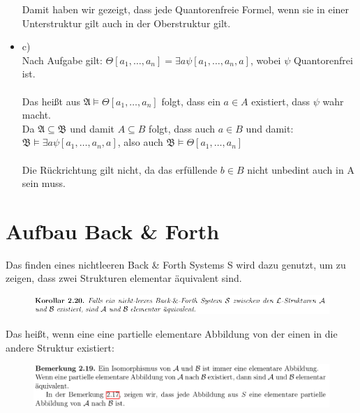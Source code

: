 \documentclass[a4paper]{scrartcl}
\begin{document}
\begin{itemize}
\begin{itemize}
            \end{itemize}

            Damit haben wir gezeigt, dass jede Quantorenfreie Formel, wenn sie in einer Unterstruktur gilt auch in der Oberstruktur gilt.\\

        \item c)\\
            Nach Aufgabe gilt: $\Theta[a_1,\dots,a_n] = \exists a \psi[a_1,\dots,a_n,a]$, wobei $\psi$ Quantorenfrei ist.\\
            \\Das heißt aus $\mathfrak{A} \vDash \Theta[a_1,\dots,a_n]$ folgt, dass ein $a \in A$ existiert, dass $\psi$ wahr macht.\\
            Da $\mathfrak{A} \subseteq \mathfrak{B}$ und damit $A \subseteq B$ folgt, dass auch $a \in B$ und damit:\\
            $\mathfrak{B} \vDash \exists a \psi[a_1,\dots,a_n,a]$, also auch $\mathfrak{B} \vDash \Theta[a_1,\dots,a_n]$\\

            \\Die Rückrichtung gilt nicht, da das erfüllende $b \in B$ nicht unbedint auch in A sein muss.\\


    \end{itemize}

\section*{Aufbau Back \& Forth}%
\label{sec:aufbau_back_forth}
    Das finden eines nichtleeren Back \& Forth Systems S wird dazu genutzt, um zu zeigen, dass zwei Strukturen elementar äquivalent sind.
    \begin{figure}[H]
        \centering
        \includegraphics[scale=0.6]{./B&F-EA.png}
        \label{fig:}
    \end{figure}

    Das heißt, wenn eine eine partielle elementare Abbildung von der einen in die andere Struktur existiert:
    
    \begin{figure}[H]
        \centering
        \includegraphics[scale=0.3]{./B&F-PEA.png}
        \label{fig:}
    \end{figure}
\end{document}

